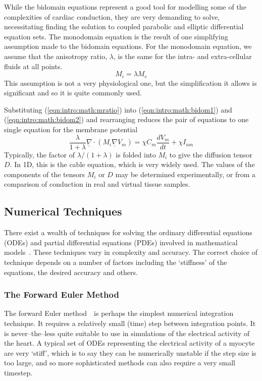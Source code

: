 While the bidomain equations represent a good tool for modelling some of the complexities of cardiac conduction, they are very demanding to solve, necessitating finding the solution to coupled parabolic and elliptic differential equation sets.
The monodomain equation is the result of one simplifying assumption made to the bidomain equations.
For the monodomain equation, we assume that the anisotropy ratio, $\lambda$, is the same for the intra- and extra-cellular fluids at all points.
\begin{equation}
M_{i} = {\lambda}M_{e}
\label{eqn:intro:math:mratio}
\end{equation}
This assumption is not a very physiological one, but the simplification it
allows is significant and so it is quite commonly used.

Substituting (\ref{eqn:intro:math:mratio}) into (\ref{eqn:intro:math:bidom1})
and (\ref{eqn:intro:math:bidom2}) and rearranging reduces the pair of equations
to one single equation for the membrane potential
\begin{equation}
\frac{\lambda}{1+\lambda}\underline{\nabla}\cdot\left(M_{i}\underline{\nabla}V_{m}\right) = \chi C_{m}\frac{dV_{m}}{dt} + \chi{I_{ion}}
\label{eqn:intro:math:mono}
\end{equation}
Typically, the factor of ${\lambda}/\left({1+\lambda}\right)$ is folded into $M_{i}$ to give the diffusion tensor $D$.
In 1D, this is the cable equation, which is very widely used.
The values of the components of the tensors $M_{i}$ or $D$ may be determined experimentally, or from a comparison of conduction in real and virtual tissue samples.

\subsection{Numerical Techniques}

There exist a wealth of techniques for solving the ordinary differential
equations (ODEs) and partial differential equations (PDEs) involved in
mathematical models~\cite{Sundnes2006}.
These techniques vary in complexity and accuracy.
The correct choice of technique depends on a number of factors including the
`stiffness' of the equations, the desired accuracy and others.

\subsubsection{The Forward Euler Method}

The forward Euler method~\cite{Birkhoff1989}\ is perhaps the simplest numerical
integration technique.
It requires a relatively small (time) step between integration points.
It is never--the--less quite suitable to use in simulations of the electrical
activity of the heart.
A typical set of ODEs representing the electrical activity of a myocyte are very
`stiff', which is to say they can be numerically unstable if the step size is
too large, and so more sophisticated methods can also require a very small
timestep.


